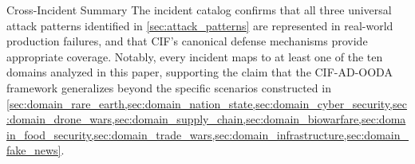 \documentclass[
  ignorenonframetext,
]{beamer}
\begin{document}
\begin{frame}[allowframebreaks]{Cross-Incident Summary}
The incident catalog confirms that all three universal attack patterns
identified in \cref{sec:attack_patterns} are represented in real-world
production failures, and that CIF's canonical defense mechanisms provide
appropriate coverage. Notably, every incident maps to at least one of
the ten domains analyzed in this paper, supporting the claim that the
CIF-AD-OODA framework generalizes beyond the specific scenarios
constructed in
\cref{sec:domain_rare_earth,sec:domain_nation_state,sec:domain_cyber_security,sec:domain_drone_wars,sec:domain_supply_chain,sec:domain_biowarfare,sec:domain_food_security,sec:domain_trade_wars,sec:domain_infrastructure,sec:domain_fake_news}.
\end{frame}
\end{document}
